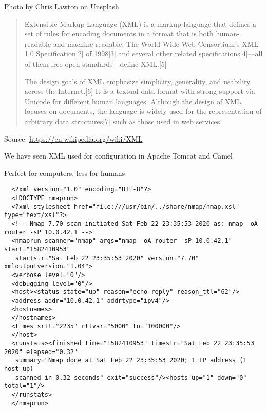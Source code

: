 \documentclass[Screen16to9,17pt]{foils}
\begin{document}
Photo by Chris Lawton on Unsplash


\begin{quote}
  Extensible Markup Language (XML) is a markup language that defines a set of rules for encoding documents in a format that is both human-readable and machine-readable. The World Wide Web Consortium's XML 1.0 Specification[2] of 1998[3] and several other related specifications[4]—all of them free open standards—define XML.[5]

  The design goals of XML emphasize simplicity, generality, and usability across the Internet.[6] It is a textual data format with strong support via Unicode for different human languages. Although the design of XML focuses on documents, the language is widely used for the representation of arbitrary data structures[7] such as those used in web services.
\end{quote}
Source: \url{https://en.wikipedia.org/wiki/XML}

\begin{list2}
\item We have seen XML used for configuration in Apache Tomcat and Camel
\item Perfect for computers, less for humans
\end{list2}


\begin{verbatim}
  <?xml version="1.0" encoding="UTF-8"?>
  <!DOCTYPE nmaprun>
  <?xml-stylesheet href="file:///usr/bin/../share/nmap/nmap.xsl" type="text/xsl"?>
  <!-- Nmap 7.70 scan initiated Sat Feb 22 23:35:53 2020 as: nmap -oA router -sP 10.0.42.1 -->
  <nmaprun scanner="nmap" args="nmap -oA router -sP 10.0.42.1" start="1582410953"
   startstr="Sat Feb 22 23:35:53 2020" version="7.70" xmloutputversion="1.04">
  <verbose level="0"/>
  <debugging level="0"/>
  <host><status state="up" reason="echo-reply" reason_ttl="62"/>
  <address addr="10.0.42.1" addrtype="ipv4"/>
  <hostnames>
  </hostnames>
  <times srtt="2235" rttvar="5000" to="100000"/>
  </host>
  <runstats><finished time="1582410953" timestr="Sat Feb 22 23:35:53 2020" elapsed="0.32"
   summary="Nmap done at Sat Feb 22 23:35:53 2020; 1 IP address (1 host up)
   scanned in 0.32 seconds" exit="success"/><hosts up="1" down="0" total="1"/>
  </runstats>
  </nmaprun>
\end{verbatim}


\end{document}
